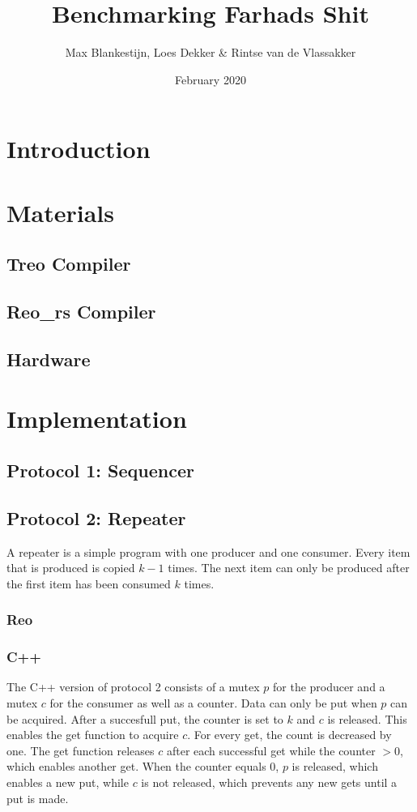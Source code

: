 \documentclass{article}
\title{Benchmarking Farhads Shit}
\author{Max Blankestijn, Loes Dekker \& Rintse van de Vlassakker}
\date{February 2020}
\begin{document}
\maketitle

\section{Introduction}

\section{Materials}
\subsection{Treo Compiler}
\subsection{Reo\_rs Compiler}
\subsection{Hardware}

\section{Implementation}
\subsection{Protocol 1: Sequencer}

\subsection{Protocol 2: Repeater}
A repeater is a simple program with one producer and one consumer. 
Every item that is produced is copied $k-1$ times.
The next item can only be produced after the first item has been consumed $k$ times.
\subsubsection{Reo}

\subsubsection{C++} %
The C++ version of protocol 2 consists of a mutex $p$ for the producer and a mutex $c$ for the consumer as well as a counter. Data can only be put when $p$ can be acquired. After a succesfull put, the counter is set to $k$ and $c$ is released. This enables the get function to acquire $c$. For every get, the count is decreased by one. The get function releases $c$ after each successful get while the counter $> 0$, which enables another get. When the counter equals 0, $p$ is released, which enables a new put, while $c$ is not released, which prevents any new gets until a put is made.
\end{document}
